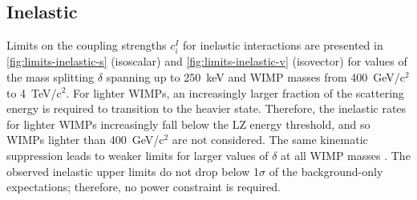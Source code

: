 \documentclass[reprint, showpacs,
preprintnumbers,
amsmath,amssymb,
aps, floatfix,
superscriptaddress,
prd, nofootinbib]{revtex4-1}
\begin{document}
\subsection{Inelastic}\label{subsec:inelastic}
Limits on the coupling strengths $c_i^I$ for inelastic interactions are presented in \autoref{fig:limits-inelastic-s} (isoscalar) and \autoref{fig:limits-inelastic-v} (isovector) for values of the mass splitting $\delta$ spanning up to 250~keV and WIMP masses from 400~GeV/c$^2$ to 4~TeV/c$^2$. 
For lighter WIMPs, an increasingly larger fraction of the scattering energy is required to transition to the heavier state. 
Therefore, the inelastic rates for lighter WIMPs increasingly fall below the LZ energy threshold, and so WIMPs lighter than 400~GeV/c$^2$ are not considered. 
The same kinematic suppression leads to weaker limits for larger values of $\delta$ at all WIMP masses \cite{Smith_2001}. 
The observed inelastic upper limits do not drop below 1$\sigma$ of the background-only expectations; therefore, no power constraint is required. 
\end{document}
